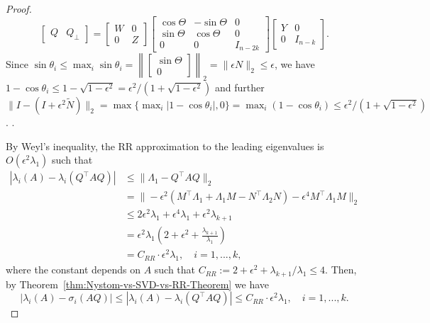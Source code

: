 \documentclass[onefignum,onetabnum]{siamart251216}
\begin{document}
\begin{proof}
{\[
    \begin{bmatrix}
        Q & Q_{\perp}
    \end{bmatrix}
    =
    \begin{bmatrix}
        W & 0 \\
        0 & Z
    \end{bmatrix}
    \begin{bmatrix}
        \cos \Theta & -\sin \Theta & 0 \\
        \sin \Theta & \cos \Theta & 0 \\
        0 & 0 & I_{n-2k}
    \end{bmatrix}
    \begin{bmatrix}
        Y & 0 \\
        0 & I_{n-k}
    \end{bmatrix}.
\]
Since $\sin \theta_i \leq \max_i \sin \theta_i = \left\|
\begin{bmatrix}
    \sin \Theta \\
    0
\end{bmatrix}
\right\|_2 = \|\epsilon N\|_2 \leq \epsilon$, we have $1 - \cos \theta_i \leq 1 - \sqrt{1-\epsilon^2} = \epsilon^2 / (1 + \sqrt{1-\epsilon^2})$ and further $\|I - (I + \epsilon^2 \widetilde{N})\|_2 = \max\{\max_i|1 - \cos \theta_i|, 0\} = \max_i (1 - \cos \theta_i) \leq \epsilon^2 / (1 + \sqrt{1-\epsilon^2})$.
}.

By Weyl's inequality, the RR approximation to the leading eigenvalues is $O(\epsilon^2 \lambda_1)$ such that
\[
    \begin{aligned}
        \left|\lambda_{i}(A) - \lambda_{i}\left(Q^\top A Q\right)\right| & \leq \|\Lambda_1 - Q^\top A Q\|_2 \\ 
        & = \|-\epsilon^2 \left(M^\top \Lambda_1 + \Lambda_1 M - N^\top \Lambda_2 N\right) - \epsilon^4 M^\top \Lambda_1 M\|_2 \\
        & \leq 2 \epsilon^2 \lambda_1 + \epsilon^4 \lambda_1 + \epsilon^2 \lambda_{k+1} 
        \\
        & = \epsilon^2 \lambda_1 \left(2 + \epsilon^2 + \frac{\lambda_{k+1}}{\lambda_1}\right) \\
        & = C_{RR} \cdot \epsilon^2 \lambda_1, \quad i=1,...,k,
    \end{aligned}
\]
where the constant depends on $A$ such that $C_{RR} := 2 + \epsilon^2 + \lambda_{k+1} / \lambda_1 \leq 4$.
Then, by Theorem~\ref{thm:Nystom-vs-SVD-vs-RR-Theorem} we have
\[
    \left|\lambda_{i}(A) - \sigma_{i}\left(A Q\right)\right| \leq \left|\lambda_{i}(A) - \lambda_{i}\left(Q^\top A Q\right)\right| \leq C_{RR} \cdot \epsilon^2 \lambda_1, \quad i=1,...,k.
\]


\end{proof}
\end{document}
